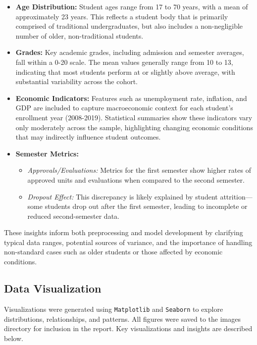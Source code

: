 \documentclass[twoside,final]{hcmut-report}
\begin{document}
\begin{itemize}[label=--]
  \item \textbf{Age Distribution:} Student ages range from 17 to 70 years, with a mean of approximately 23 years. This reflects a student body that is primarily comprised of traditional undergraduates, but also includes a non-negligible number of older, non-traditional students.
  \item \textbf{Grades:} Key academic grades, including admission and semester averages, fall within a 0-20 scale. The mean values generally range from 10 to 13, indicating that most students perform at or slightly above average, with substantial variability across the cohort.
  \item \textbf{Economic Indicators:} Features such as unemployment rate, inflation, and GDP are included to capture macroeconomic context for each student's enrollment year (2008-2019). Statistical summaries show these indicators vary only moderately across the sample, highlighting changing economic conditions that may indirectly influence student outcomes.
  \item \textbf{Semester Metrics:}
        \begin{itemize}[parsep=0pt, itemsep=0pt, topsep=0pt, label=+]
          \item \textit{Approvals/Evaluations:} Metrics for the first semester show higher rates of approved units and evaluations when compared to the second semester.
          \item \textit{Dropout Effect:} This discrepancy is likely explained by student attrition—some students drop out after the first semester, leading to incomplete or reduced second-semester data.
        \end{itemize}
\end{itemize}

These insights inform both preprocessing and model development by clarifying typical data ranges, potential sources of variance, and the importance of handling non-standard cases such as older students or those affected by economic conditions.

\subsection{Data Visualization}

Visualizations were generated using \texttt{Matplotlib} and \texttt{Seaborn} to explore distributions, relationships, and patterns. All figures were saved to the images directory for inclusion in the report. Key visualizations and insights are described below.
\end{document}
